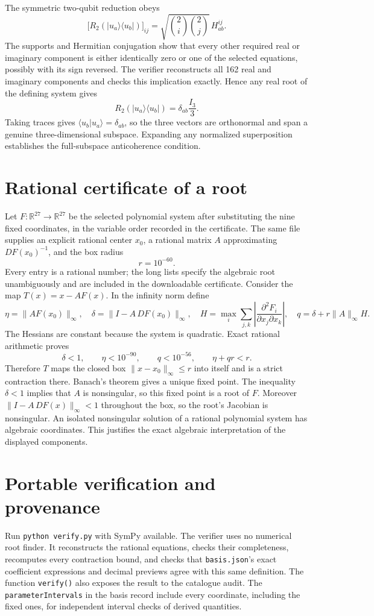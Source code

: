 \documentclass[11pt]{article}
\begin{document}
The symmetric two-qubit reduction obeys
\[
 \bigl[R_2(|u_a\rangle\langle u_b|)\bigr]_{ij}
 =\sqrt{\binom2i\binom2j}\,H_{ab}^{ij}.
\]
The supports and Hermitian conjugation show that every other required real or
imaginary component is either identically zero or one of the selected equations,
possibly with its sign reversed. The verifier reconstructs all 162 real and
imaginary components and checks this implication exactly. Hence any real root
of the defining system gives
\[
 R_2(|u_a\rangle\langle u_b|)=\delta_{ab}\frac{I_3}{3}.
\]
Taking traces gives $\langle u_b|u_a\rangle=\delta_{ab}$, so the three vectors are
orthonormal and span a genuine three-dimensional subspace. Expanding any
normalized superposition establishes the full-subspace anticoherence condition.

\section{Rational certificate of a root}
Let $F:\mathbb R^{27}\to\mathbb R^{27}$ be the selected polynomial system after
substituting the nine fixed coordinates, in the variable order recorded in the
certificate. The same file supplies an explicit rational center $x_0$, a rational
matrix $A$ approximating $DF(x_0)^{-1}$, and the box radius
\[
 r=10^{-60}.
\]
Every entry is a rational number; the long lists specify the algebraic root
unambiguously and are included in the downloadable certificate. Consider the
map $T(x)=x-AF(x)$. In the infinity norm define
\[
 \eta=\|AF(x_0)\|_\infty,\quad
 \delta=\|I-A\,DF(x_0)\|_\infty,\quad
 H=\max_i\sum_{j,k}\left|\frac{\partial^2F_i}{\partial x_j\partial x_k}\right|,
 \quad q=\delta+r\|A\|_\infty H.
\]
The Hessians are constant because the system is quadratic. Exact rational
arithmetic proves
\[
 \delta<1,\qquad \eta<10^{-90},\qquad q<10^{-56},
 \qquad \eta+qr<r.
\]
Therefore $T$ maps the closed box $\|x-x_0\|_\infty\le r$ into itself and is a
strict contraction there. Banach's theorem gives a unique fixed point.
The inequality $\delta<1$ implies that $A$ is nonsingular, so this fixed point is
a root of $F$. Moreover $\|I-A\,DF(x)\|_\infty<1$ throughout the box, so the root's
Jacobian is nonsingular. An isolated nonsingular solution of a rational
polynomial system has algebraic coordinates. This justifies the exact algebraic
interpretation of the displayed components.

\section{Portable verification and provenance}
Run \texttt{python verify.py} with SymPy available. The verifier uses no numerical
root finder. It reconstructs the rational equations, checks their completeness,
recomputes every contraction bound, and checks that \texttt{basis.json}'s exact
coefficient expressions and decimal previews agree with this same definition.
The function \texttt{verify()} also exposes the result to the catalogue audit.
The \texttt{parameterIntervals} in the basis record include every coordinate,
including the fixed ones, for independent interval checks of derived quantities.
\end{document}
